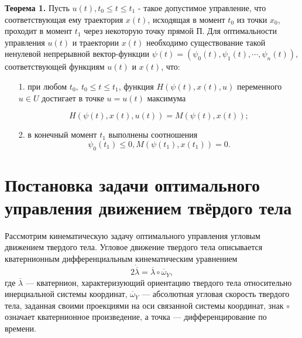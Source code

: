 \documentclass[14pt]{extreport}
\begin{document}
\textbf{Теорема 1.} Пусть $u(t), t_0 \leq t \leq t_1$ - такое допустимое управление, что соответствующая ему траекто­рия $x(t)$, исходящая в момент $t_0$ из точки $x_0$, проходит в момент $t_1$ через некоторую точку прямой П. Для оптимальности управления $u(t)$ и траектории $x(t)$ необходимо существование такой ненулевой непрерыв­ной вектор-функции $\psi(t)=(\psi_0(t),\psi_1(t),\cdots,\psi_n(t))$, со­ответствующей функциям $u(t)$ и $x(t)$, что:
\begin{itemize}
\item[1.] при любом $t_0,\ t_0 \leq t \leq t_1$, функция $H(\psi(t),x(t),u)$ переменного $u\in U$ достигает в точке $u = u(t)$ макси­мума 

\begin{equation}
\label{max-H}
H(\psi(t),x(t),u(t))=M(\psi(t),x(t));
\end{equation}
\item[2.] в конечный момент $t_1$ выполнены соотношения
\begin{equation}
\label{fin-ratio}
\psi_0(t_1) \leq 0, M(\psi(t_1),x(t_1))=0.
\end{equation}
\end{itemize}

\chapter{Постановка задачи оптимального управления движением твёрдого тела}
Рассмотрим кинематическую задачу оптимального управления угло­вым движением твердого тела. Угловое движение твердого тела описыва­ется кватернионным дифференциальным кинематическим уравнением
\begin{equation}
\label{diff-kinematic-eq}
2\dot{\overline{\lambda}} = \overline{\lambda} \circ \overline{\omega}_{Y},
\end{equation}
где $\overline{\lambda}$ — кватернион, характеризующий ориентацию твердого тела относи­тельно инерциальной системы координат, $\overline{\omega}_{Y}$ — абсолютная угловая скорость твердого тела, заданная своими проекциями на оси связанной си­стемы координат, знак $\circ$ означает кватернионное произведение, а точка — дифференцирование по времени. 
\end{document}
